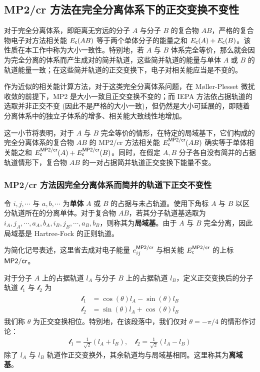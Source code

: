 \subsection{MP2/cr 方法在完全分离体系下的正交变换不变性}

对于完全分离体系，即距离无穷远的分子 $A$ 与分子 $B$ 的复合物 $AB$，严格的复合物电子对方法相关能 $E_{\textsf{c}} (AB)$ 等于两个单体分子的能量之和 $E_{\textsf{c}} (A) + E_{\textsf{c}} (B)$。该性质在本工作中称为大小一致性。特别地，若 $A$ 与 $B$ 体系完全等价，那么就会因为完全分离的体系而产生成对的简并轨道，这些简并轨道的能量与单体 $A$ 或 $B$ 的轨道能量一致；在这些简并轨道的正交变换下，电子对相关能应当是不变的。

作为近似的相关能计算方法，对于这类完全分离体系问题，在 M{\o}ller-Plesset 微扰收敛的前提下，MP2 是大小一致且正交变换不变的\cite{Szabo-Ostlund.Dover.1996, Shavitt-Bartlett.Cambridge.2009}；而 IEPA 方法依占据轨道的选取并非正交不变 (因此不是严格的大小一致)，但仍然是大小可延展的\cite{Szabo-Ostlund.Dover.1996, Zhang-Scheffler.NJP.2016}，即随着分离体系中的独立子体系的增多、相关能大致线性地增加。

这一小节将表明，对于 $A$ 与 $B$ 完全等价的情形，在特定的局域基下，它们构成的完全分离体系的复合物 $AB$ 的 MP2/cr 方法相关能 $E_{\textsf{c}}^{\textsf{MP2/cr}} (AB)$ 确实等于单体相关能之和 $E_{\textsf{c}}^{\textsf{MP2/cr}} (A) + E_{\textsf{c}}^{\textsf{MP2/cr}} (B)$。同时，在假定 $A, B$ 分子各自没有简并的占据轨道情形下，复合物 $AB$ 的一对占据简并轨道正交变换下能量不变。

\subsubsection{MP2/cr 方法因完全分离体系而简并的轨道下正交不变性}

令 $i, j, \cdots$ 与 $a, b, \cdots$ 为\textbf{单体} $A$ 或 $B$ 的占据与未占轨道。使用下角标 $A$ 与 $B$ 以区分轨道所在的分离单体。对于复合物 $AB$，若其分子轨道基选取为 $i_A, j_A, \cdots, \allowbreak a_A, b_A, \allowbreak i_B, j_B, \cdots, \allowbreak a_B, b_B$，则称其为\textbf{局域基}。由于 $A$ 与 $B$ 完全分离，因此局域基是 Hartree-Fock 的正则轨道。

为简化记号表述，这里省去成对电子能量 $e_{ij}^{\textsf{MP2/cr}}$ 与相关能 $E_{\textsf{c}}^{\textsf{MP2/cr}}$ 的上标 $\textsf{MP2/cr}$。

对于分子 $A$ 上的占据轨道 $l_A$ 与分子 $B$ 上的占据轨道 $l_B$，定义正交变换后的分子轨道 $\mathscr{l}_1$ 与 $\mathscr{l}_2$ 为
\begin{align}
  \label{eq.2.invariance-general}
  \begin{aligned}
    \mathscr{l}_1 &= \cos(\theta) l_A - \sin(\theta) l_B \\
    \mathscr{l}_2 &= \sin(\theta) l_A + \cos(\theta) l_B
  \end{aligned}
\end{align}
我们称 $\theta$ 为正交变换相位。特别地，在该段落中，我们仅对 $\theta = - \pi/4$ 的情形作讨论：
\begin{align}
  \label{eq.2.invariance-specific}
  \mathscr{l}_1 = \frac{1}{\sqrt{2}} (l_A + l_B), \quad \mathscr{l}_2 = \frac{1}{\sqrt{2}} (l_A - l_B)
\end{align}
除了 $l_A$ 与 $l_B$ 轨道作正交变换外，其余轨道均与局域基相同。这里称其为\textbf{离域基}。


